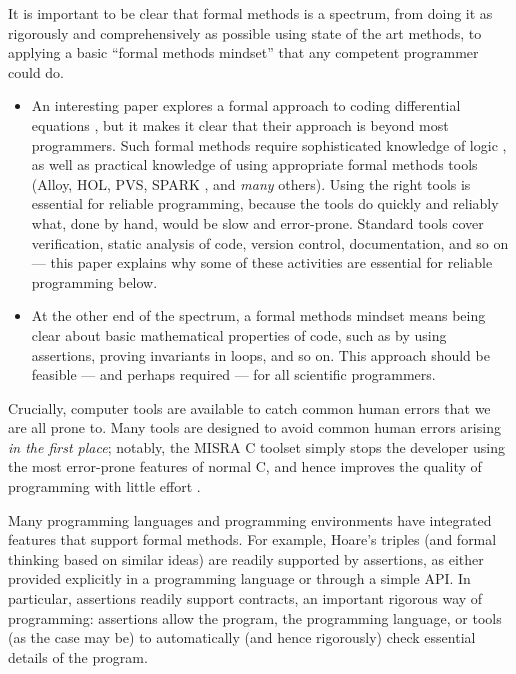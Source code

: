 \documentclass[10pt,a4paper]{article}
\begin{document}
It is important to be clear that formal methods is a spectrum, from doing it as rigorously and comprehensively as possible using state of the art methods, to applying a basic ``formal methods mindset'' that any competent programmer could do.

\begin{itemize}\raggedright\item An interesting paper explores a formal approach to coding differential equations \cite{differential-equations}, but it makes it clear that their approach is beyond most programmers. Such formal methods require sophisticated knowledge of logic \cite{cbc}, as well as practical knowledge of using appropriate formal methods tools (Alloy, HOL, PVS, SPARK \cite{spark}, and \emph{many\/} others). Using the right tools is essential for reliable programming, because the tools do quickly and reliably what, done by hand, would be slow and error-prone. Standard tools cover verification, static analysis of code, version control, documentation, and so on --- this paper explains why some of these activities are essential for reliable programming below. 

\item At the other end of the spectrum, a formal methods mindset means being clear about basic mathematical properties of code, such as by using assertions, proving invariants in loops, and so on. This approach should be feasible --- and perhaps required --- for all scientific programmers.
\end{itemize}

Crucially, computer tools are available to catch common human errors that we are all prone to. Many tools are designed to avoid common human errors arising \emph{in the first place\/}; notably, the MISRA C toolset simply stops the developer using the most error-prone features of normal C, and hence improves the quality of programming with little effort \cite{misra}.

Many programming languages and programming environments have integrated features that support formal methods. For example, Hoare's triples \cite{hoare} (and formal thinking based on similar ideas) are readily supported by assertions, as either provided explicitly in a programming language or through a simple API\@. In particular, assertions readily support contracts, an important rigorous way of programming: assertions allow the program, the programming language, or tools (as the case may be) to automatically (and hence rigorously) check essential details of the program. 
\end{document}
